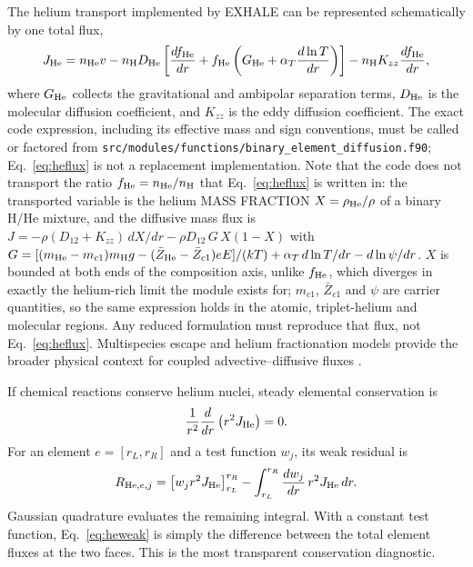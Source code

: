 \documentclass[english,a4paper]{my_memo}
\newcommand{\code}[1]{\texttt{#1}}
\begin{document}
The helium transport implemented by EXHALE can be represented schematically by
one total flux,
\begin{equation}
 J_{\rm He}=n_{\rm He}v
 -n_{\rm H}D_{\rm He}
 \left[\frac{df_{\rm He}}{dr}
 +f_{\rm He}\left(G_{\rm He}
 +\alpha_T\frac{d\ln T}{dr}\right)\right]
 -n_{\rm H}K_{zz}\frac{df_{\rm He}}{dr},
 \label{eq:heflux}
\end{equation}
where \(G_{\rm He}\) collects the gravitational and ambipolar separation
terms, \(D_{\rm He}\) is the molecular diffusion coefficient, and \(K_{zz}\)
is the eddy diffusion coefficient.  The exact code expression, including its
effective mass and sign conventions, must be called or factored from
\code{src/modules/functions/binary\_element\_diffusion.f90};
Eq.~\eqref{eq:heflux} is not a replacement implementation.  Note that the
code does not transport the ratio \(f_{\rm He}=n_{\rm He}/n_{\rm H}\) that
Eq.~\eqref{eq:heflux} is written in: the transported variable is the helium
MASS FRACTION \(X=\rho_{\rm He}/\rho\) of a binary H/He mixture, and the
diffusive mass flux is
\(J=-\rho(D_{12}+K_{zz})\,dX/dr-\rho D_{12}\,G\,X(1-X)\) with
\(G=[(m_{\rm He}-m_{c1})m_{\rm H}g-(\bar Z_{\rm He}-\bar Z_{c1})eE]/(kT)
+\alpha_T\,d\ln T/dr-d\ln\psi/dr\).  \(X\) is bounded at both ends of the
composition axis, unlike \(f_{\rm He}\), which diverges in exactly the
helium-rich limit the module exists for; \(m_{c1}\), \(\bar Z_{c1}\) and
\(\psi\) are carrier quantities, so the same expression holds in the atomic,
triplet-helium and molecular regions.  Any reduced formulation must reproduce
that flux, not Eq.~\eqref{eq:heflux}.  Multispecies escape and helium
fractionation models provide the broader physical context for coupled advective--diffusive fluxes
\cite{Koskinen2013a,Xing2023,Taylor2025}.

If chemical reactions conserve helium nuclei, steady elemental conservation is
\begin{equation}
 \frac{1}{r^2}\frac{d}{dr}\left(r^2J_{\rm He}\right)=0.
 \label{eq:heconservation}
\end{equation}
For an element \(e=[r_L,r_R]\) and a test function \(w_j\), its weak residual is
\begin{equation}
 R_{{\rm He},e,j}=
 \left[w_j r^2J_{\rm He}\right]_{r_L}^{r_R}
 -\int_{r_L}^{r_R}\frac{dw_j}{dr}\,r^2J_{\rm He}\,dr.
 \label{eq:heweak}
\end{equation}
Gaussian quadrature evaluates the remaining integral.  With a constant test
function, Eq.~\eqref{eq:heweak} is simply the difference between the total
element fluxes at the two faces.  This is the most transparent conservation
diagnostic.
\end{document}
